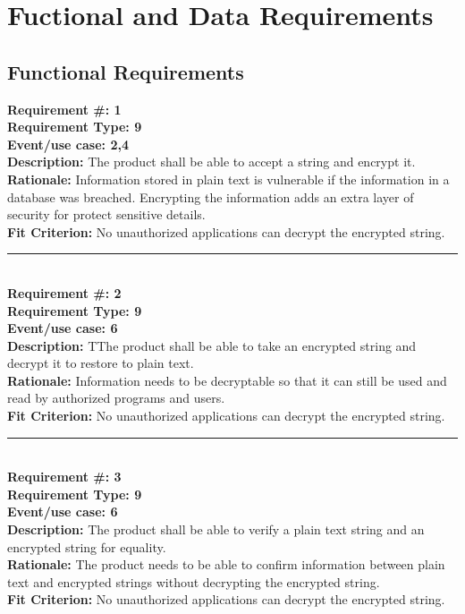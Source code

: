 \documentclass[12pt]{article}
\begin{document}
\section{Fuctional and Data Requirements}

\subsection{Functional Requirements}

	\textbf{Requirement \#: 1}\\
	\textbf{Requirement Type: 9	}\\
	\textbf{Event/use case: 2,4}\\
	\textbf{Description:} The product shall be able to accept a string and encrypt it.\\
	\textbf{Rationale:} Information stored in plain text is vulnerable if the information in a database was breached. Encrypting the information adds an extra layer of security for protect sensitive details.\\
	\textbf{Fit Criterion:} No unauthorized applications can decrypt the encrypted string.

	\noindent\rule{12cm}{0.4pt} \\ 

	\noindent\textbf{Requirement \#: 2}\\
	\textbf{Requirement Type: 9	}\\
	\textbf{Event/use case: 6}\\
	\textbf{Description:} TThe product shall be able to take an encrypted string and decrypt it to restore to plain text.\\
	\textbf{Rationale:} Information needs to be decryptable so that it can still be used and read by authorized programs and users.	\\
	\textbf{Fit Criterion:} No unauthorized applications can decrypt the encrypted string.\\

	\noindent\rule{12cm}{0.4pt} \\ 

	\noindent\textbf{Requirement \#: 3}\\
	\textbf{Requirement Type: 9	}\\
	\textbf{Event/use case: 6}\\
	\textbf{Description:} The product shall be able to verify a plain text string and an encrypted string for equality.\\
	\textbf{Rationale:} The product needs to be able to confirm information between plain text and encrypted strings without decrypting the encrypted string.\\
	\textbf{Fit Criterion:} No unauthorized applications can decrypt the encrypted string.\\
\end{document}
